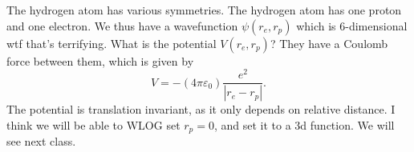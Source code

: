 The hydrogen atom has various symmetries. The hydrogen atom has one proton and one electron. We thus have a wavefunction $\psi (r_e,r_p)$ which is 6-dimensional wtf that's terrifying. What is the potential $V(r_e,r_p)$? They have a Coulomb force between them, which is given by
\[
	V=-\left( 4\pi \varepsilon _0 \right) \frac{e^2}{\left| r_e-r_p \right| } 
.\]
The potential is translation invariant, as it only depends on relative distance. I think we will be able to WLOG set $r_p=0$, and set it to a 3d function. We will see next class.
